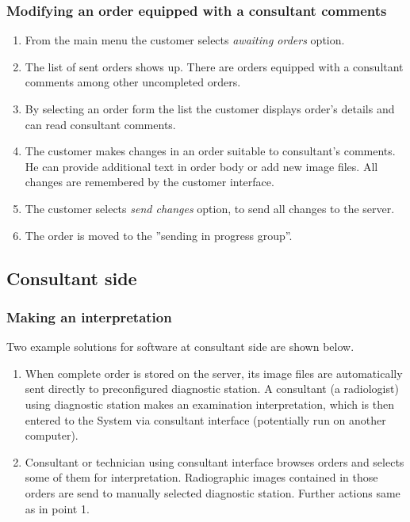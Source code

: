 \documentclass[a4paper]{article}
\begin{document}
\subsubsection{Modifying an order equipped with a consultant comments}

\begin{enumerate}
  \item From the main menu the customer selects \emph{awaiting orders} option.
  \item The list of sent orders shows up. There are orders equipped with a consultant
  comments among other uncompleted orders.
  \item By selecting an order form the list the customer displays order's
  details and can read consultant comments.
  \item The customer makes changes in an order suitable to consultant's comments. He can
  provide additional text in order body or add new image files. All changes are 
  remembered by the customer interface.
  \item The customer selects \emph{send changes} option, to send all changes to the
  server. 
  \item The order is moved to the ''sending in progress group''.
\end{enumerate}

\subsection{Consultant side}

\subsubsection{Making an interpretation}

Two example solutions for software at consultant side are shown below. 

\begin{enumerate}
  \item When complete order is stored on the server, its image files are automatically
  sent directly to preconfigured diagnostic station. A consultant (a radiologist)
  using diagnostic station makes an examination interpretation, which is then entered to
  the System via consultant interface (potentially run on another computer).
  \item Consultant or technician using consultant interface browses orders and
  selects some of them for interpretation. Radiographic images contained in those orders
  are send to manually selected diagnostic station. Further actions same as in point 1.
\end{enumerate}
\end{document}
